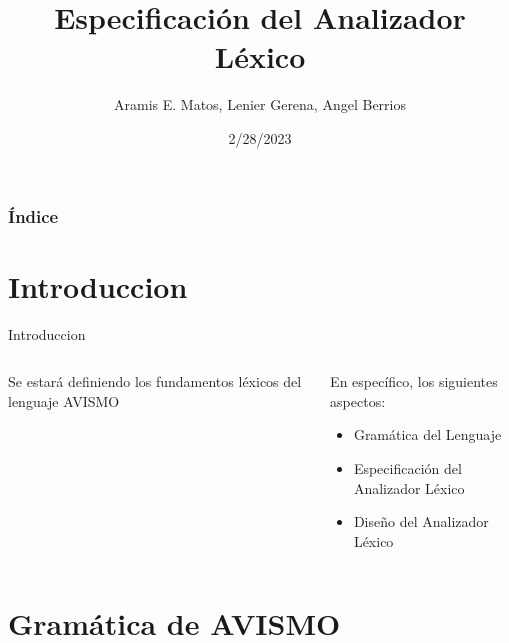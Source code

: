 \documentclass[14pt, aspectratio=169]{beamer}
\title{Especificación del Analizador Léxico}
\author{Aramis E. Matos, Lenier Gerena, Angel Berrios}
\date{2/28/2023}
\begin{document}
\maketitle
\begin{frame}%
    \frametitle{Índice}
    \tableofcontents
\end{frame}

\section{Introduccion}

\begin{frame}{Introduccion}
    \begin{columns}
        \begin{column}{0.5\textwidth}
            Se estará definiendo los fundamentos léxicos del lenguaje AVISMO \cite{narciso_farias_gramatica_2012}
        \end{column}
        \begin{column}{.5\textwidth}
            En específico, los siguientes aspectos:
            \begin{itemize}
                \item Gramática del Lenguaje
                \item Especificación del Analizador Léxico
                \item Diseño del Analizador Léxico
            \end{itemize}
        \end{column}
    \end{columns}
    
\end{frame}

\section{Gramática de AVISMO}
\end{document}
